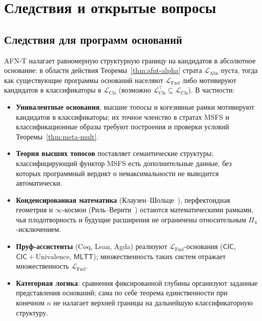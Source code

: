 \documentclass[11pt]{article}
\theoremstyle{plain}
\theoremstyle{definition}
\newcommand{\LFnd}{\mathcal{L}_{\mathrm{Fnd}}}
\newcommand{\LCls}{\mathcal{L}_{\mathrm{Cls}}}
\newcommand{\LClsMax}{\mathcal{L}_{\mathrm{Cls}}^{\top}}
\newcommand{\LAbs}{\mathcal{L}_{\mathrm{Abs}}}
\newcommand{\MLTT}{\mathsf{MLTT}}
\newcommand{\CIC}{\mathsf{CIC}}
\begin{document}
\section{Следствия и открытые вопросы}\label{sec:consequences}

\subsection{Следствия для программ оснований}

AFN-T налагает равномерную структурную границу на кандидатов в абсолютное основание: в области действия Теоремы~\ref{thm:afnt-alpha} страта $\LAbs$ пуста, тогда как существующие программы оснований населяют $\LFnd$ либо мотивируют кандидатов в классификаторы в $\LCls$ (возможно $\LClsMax \subseteq \LCls$). В частности:
\begin{itemize}\setlength{\itemsep}{1pt}
\item \textbf{Унивалентные основания}, высшие топосы и когезивные рамки мотивируют кандидатов в классификаторы; их точное членство в стратах MSFS и классификационные образы требуют построения и проверки условий Теоремы~\ref{thm:meta-mult}.
\item \textbf{Теория высших топосов} поставляет семантические структуры; классифицирующий функтор MSFS есть дополнительные данные, без которых программный вердикт о немаксимальности не выводится автоматически.
\item \textbf{Конденсированная математика} (Клаузен--Шольце~\cite{ClausenScholze2019}), перфектоидная геометрия и $\infty$-космои (Риль--Верити~\cite{RiehlVerity2022}) остаются математическими рамками, чья плодотворность и будущие расширения не ограничены относительным $\Pi_4$-исключением.
\item \textbf{Пруф-ассистенты} (Coq, Lean, Agda) реализуют $\LFnd$-основания ($\CIC$, $\CIC + \mathrm{Univalence}$, $\MLTT$); множественность таких систем отражает множественность $\LFnd$.
\item \textbf{Категорная логика}: сравнения фиксированной глубины организуют заданные представления оснований; сама по себе теорема единственности при конечном $n$ не налагает верхней границы на дальнейшую классификаторную структуру.
\end{itemize}
\end{document}
